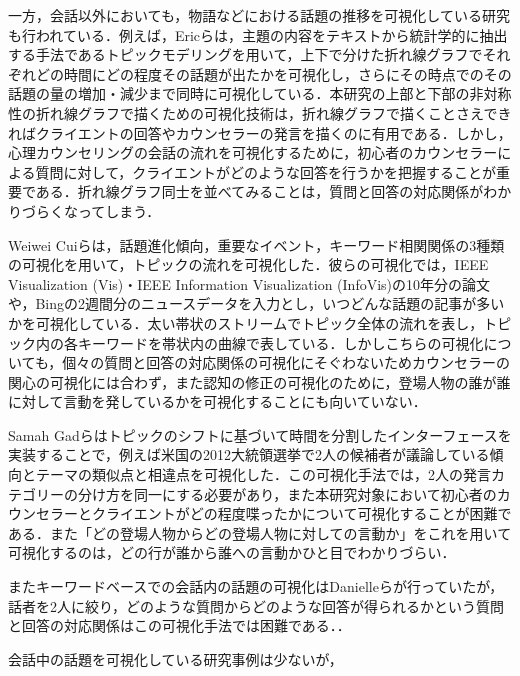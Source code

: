 \documentclass[shuuron]{kuee}
\begin{document}
一方，会話以外においても，物語などにおける話題の推移を可視化している研究も行われている．例えば，Ericら\cite{taskdriven}は，主題の内容をテキストから統計学的に抽出する手法であるトピックモデリングを用いて，上下で分けた折れ線グラフでそれぞれどの時間にどの程度その話題が出たかを可視化し，さらにその時点でのその話題の量の増加・減少まで同時に可視化している．本研究の上部と下部の非対称性の折れ線グラフで描くための可視化技術は，折れ線グラフで描くことさえできればクライエントの回答やカウンセラーの発言を描くのに有用である．しかし，心理カウンセリングの会話の流れを可視化するために，初心者のカウンセラーによる質問に対して，クライエントがどのような回答を行うかを把握することが重要である．折れ線グラフ同士を並べてみることは，質問と回答の対応関係がわかりづらくなってしまう．

Weiwei Cuiら\cite{cui2011textflow}は，話題進化傾向，重要なイベント，キーワード相関関係の3種類の可視化を用いて，トピックの流れを可視化した．彼らの可視化では，IEEE Visualization (Vis)・IEEE Information Visualization (InfoVis)の10年分の論文や，Bingの2週間分のニュースデータを入力とし，いつどんな話題の記事が多いかを可視化している．太い帯状のストリームでトピック全体の流れを表し，トピック内の各キーワードを帯状内の曲線で表している．しかしこちらの可視化についても，個々の質問と回答の対応関係の可視化にそぐわないためカウンセラーの関心の可視化には合わず，また認知の修正の可視化のために，登場人物の誰が誰に対して言動を発しているかを可視化することにも向いていない．

Samah Gadら\cite{gad2015themedelta}はトピックのシフトに基づいて時間を分割したインターフェースを実装することで，例えば米国の2012大統領選挙で2人の候補者が議論している傾向とテーマの類似点と相違点を可視化した．この可視化手法では，2人の発言カテゴリーの分け方を同一にする必要があり，また本研究対象において初心者のカウンセラーとクライエントがどの程度喋ったかについて可視化することが困難である．また「どの登場人物からどの登場人物に対しての言動か」をこれを用いて可視化するのは，どの行が誰から誰への言動かひと目でわかりづらい．

またキーワードベースでの会話内の話題の可視化はDanielleら\cite{angus2012conceptual}が行っていたが，話者を2人に絞り，どのような質問からどのような回答が得られるかという質問と回答の対応関係はこの可視化手法では困難である．．%

会話中の話題を可視化している研究事例は少ないが，
\end{document}
